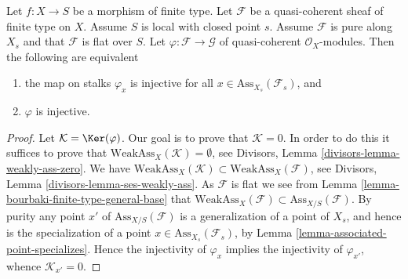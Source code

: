 \begin{lemma}
\label{lemma-injectivity-map-source-flat-pure}
Let $f : X \to S$ be a morphism of finite type.
Let $\mathcal{F}$ be a quasi-coherent sheaf of finite type on $X$.
Assume $S$ is local with closed point $s$.
Assume $\mathcal{F}$ is pure along $X_s$ and
that $\mathcal{F}$ is flat over $S$.
Let $\varphi : \mathcal{F} \to \mathcal{G}$ of quasi-coherent
$\mathcal{O}_X$-modules. Then the following are equivalent
\begin{enumerate}
\item the map on stalks $\varphi_x$ is injective for all
$x \in \text{Ass}_{X_s}(\mathcal{F}_s)$, and
\item $\varphi$ is injective.
\end{enumerate}
\end{lemma}

\begin{proof}
Let $\mathcal{K} = \Ker(\varphi)$. Our goal is to prove that
$\mathcal{K} = 0$. In order to do this it suffices to prove that
$\text{WeakAss}_X(\mathcal{K}) = \emptyset$, see
Divisors, Lemma \ref{divisors-lemma-weakly-ass-zero}.
We have
$\text{WeakAss}_X(\mathcal{K}) \subset \text{WeakAss}_X(\mathcal{F})$, see
Divisors, Lemma \ref{divisors-lemma-ses-weakly-ass}.
As $\mathcal{F}$ is flat we see from
Lemma \ref{lemma-bourbaki-finite-type-general-base}
that $\text{WeakAss}_X(\mathcal{F}) \subset \text{Ass}_{X/S}(\mathcal{F})$.
By purity any point $x'$ of $\text{Ass}_{X/S}(\mathcal{F})$
is a generalization of a point of $X_s$, and hence is the
specialization of a point $x \in \text{Ass}_{X_s}(\mathcal{F}_s)$, by
Lemma \ref{lemma-associated-point-specializes}.
Hence the injectivity of $\varphi_x$ implies the injectivity of
$\varphi_{x'}$, whence $\mathcal{K}_{x'} = 0$.
\end{proof}
